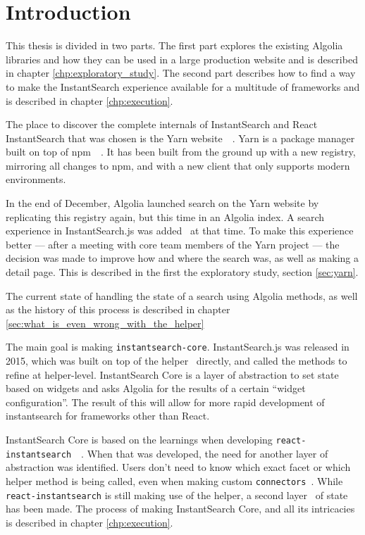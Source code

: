 
\chapter{Introduction} %
\label{chp:introduction}

This thesis is divided in two parts. The first part explores the existing Algolia libraries and how they can be used in a large production website and is described in chapter \ref{chp:exploratory_study}. The second part describes how to find a way to make the InstantSearch experience available for a multitude of frameworks and is described in chapter \ref{chp:execution}.

The place to discover the complete internals of InstantSearch and React InstantSearch that was chosen is the Yarn website~\cite{yarn-site}~. Yarn is a package manager built on top of npm~\cite{npm-github}~. It has been built from the ground up with a new registry, mirroring all changes to npm, and with a new client that only supports modern environments.

In the end of December, Algolia launched search on the Yarn website by replicating this registry again, but this time in an Algolia index. A search experience in InstantSearch.js was added~\cite{yarn-pr-add-algolia} at that time. To make this experience better --- after a meeting with core team members of the Yarn project --- the decision was made to improve how and where the search was, as well as making a detail page. This is described in the first the exploratory study, section \ref{sec:yarn}.

The current state of handling the state of a search using Algolia methods, as well as the history of this process is described in chapter \ref{sec:what_is_even_wrong_with_the_helper}

The main goal is making {\tt instantsearch-core}. InstantSearch.js was released in 2015, which was built on top of the helper~\cite{algolia-js-helper} directly, and called the methods to refine at helper-level. InstantSearch Core is a layer of abstraction to set state based on widgets and asks Algolia for the results of a certain ``widget configuration''. The result of this will allow for more rapid development of instantsearch for frameworks other than React.

InstantSearch Core is based on the learnings when developing {\tt react-instantsearch}~\cite{react-instantsearch}~.  When that was developed, the need for another layer of abstraction was identified. Users don't need to know which exact facet or which helper method is being called, even when making custom {\tt connectors}\cite{react-instantsearch-connectors}~. While {\tt react-instantsearch} is still making use of the helper, a second layer~\cite{react-instantsearch-search-state} of state has been made. The process of making InstantSearch Core, and all its intricacies is described in chapter \ref{chp:execution}.
